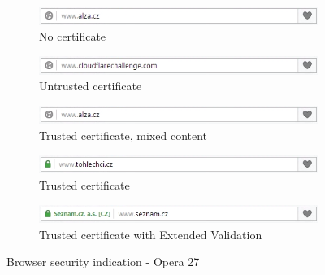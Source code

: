 \begin{figure}
  \begin{subfigure}[b]{\textwidth}
    \centering
    \includegraphics[scale=0.6]{images/browsers/o-none.png}
    \caption{No certificate}
  \end{subfigure}
  \begin{subfigure}[b]{\textwidth}
    \centering
    \includegraphics[scale=0.6]{images/browsers/o-untrusted.png}
    \caption{Untrusted certificate}
  \end{subfigure}
  \begin{subfigure}[b]{\textwidth}
    \centering
    \includegraphics[scale=0.6]{images/browsers/o-mixed.png}
    \caption{Trusted certificate, mixed content}
  \end{subfigure}
  \begin{subfigure}[b]{\textwidth}
    \centering
    \includegraphics[scale=0.6]{images/browsers/o-dv.png}
    \caption{Trusted certificate}
  \end{subfigure}
  \begin{subfigure}[b]{\textwidth}
    \centering
    \includegraphics[scale=0.6]{images/browsers/o-ev.png}
    \caption{Trusted certificate with Extended Validation}
  \end{subfigure}
  \caption{Browser security indication - Opera 27}
\end{figure}

